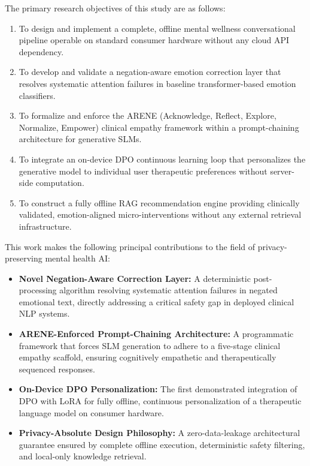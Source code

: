 \documentclass[12pt,twoside]{article}
\begin{document}
The primary research objectives of this study are as follows:
\begin{enumerate}[leftmargin=2em]
  \item To design and implement a complete, offline mental wellness conversational pipeline operable on standard consumer hardware without any cloud API dependency.
  \item To develop and validate a negation-aware emotion correction layer that resolves systematic attention failures in baseline transformer-based emotion classifiers.
  \item To formalize and enforce the ARENE (Acknowledge, Reflect, Explore, Normalize, Empower) clinical empathy framework within a prompt-chaining architecture for generative SLMs.
  \item To integrate an on-device DPO continuous learning loop that personalizes the generative model to individual user therapeutic preferences without server-side computation.
  \item To construct a fully offline RAG recommendation engine providing clinically validated, emotion-aligned micro-interventions without any external retrieval infrastructure.
\end{enumerate}

This work makes the following principal contributions to the field of privacy-preserving mental health AI:
\begin{itemize}[leftmargin=2em]
  \item \textbf{Novel Negation-Aware Correction Layer:} A deterministic post-processing algorithm resolving systematic attention failures in negated emotional text, directly addressing a critical safety gap in deployed clinical NLP systems.
  \item \textbf{ARENE-Enforced Prompt-Chaining Architecture:} A programmatic framework that forces SLM generation to adhere to a five-stage clinical empathy scaffold, ensuring cognitively empathetic and therapeutically sequenced responses.
  \item \textbf{On-Device DPO Personalization:} The first demonstrated integration of DPO with LoRA for fully offline, continuous personalization of a therapeutic language model on consumer hardware.
  \item \textbf{Privacy-Absolute Design Philosophy:} A zero-data-leakage architectural guarantee ensured by complete offline execution, deterministic safety filtering, and local-only knowledge retrieval.
\end{itemize}
\end{document}
